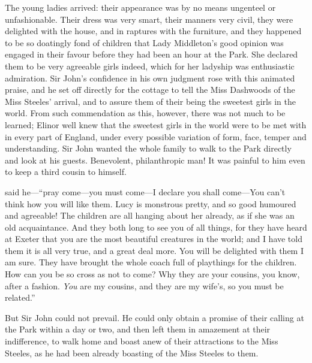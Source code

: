 The young ladies arrived: their appearance was by no means ungenteel or unfashionable. Their dress was very smart, their manners very civil, they were delighted with the house, and in raptures with the furniture, and they happened to be so doatingly fond of children that Lady Middleton's good opinion was engaged in their favour before they had been an hour at the Park. She declared them to be very agreeable girls indeed, which for her ladyship was enthusiastic admiration. Sir John's confidence in his own judgment rose with this animated praise, and he set off directly for the cottage to tell the Miss Dashwoods of the Miss Steeles' arrival, and to assure them of their being the sweetest girls in the world. From such commendation as this, however, there was not much to be learned; Elinor well knew that the sweetest girls in the world were to be met with in every part of England, under every possible variation of form, face, temper and understanding. Sir John wanted the whole family to walk to the Park directly and look at his guests. Benevolent, philanthropic man! It was painful to him even to keep a third cousin to himself.

 said he---“pray come---you must come---I declare you shall come---You can't think how you will like them. Lucy is monstrous pretty, and so good humoured and agreeable! The children are all hanging about her already, as if she was an old acquaintance. And they both long to see you of all things, for they have heard at Exeter that you are the most beautiful creatures in the world; and I have told them it is all very true, and a great deal more. You will be delighted with them I am sure. They have brought the whole coach full of playthings for the children. How can you be so cross as not to come? Why they are your cousins, you know, after a fashion. {\em You} are my cousins, and they are my wife's, so you must be related.”

But Sir John could not prevail. He could only obtain a promise of their calling at the Park within a day or two, and then left them in amazement at their indifference, to walk home and boast anew of their attractions to the Miss Steeles, as he had been already boasting of the Miss Steeles to them.

